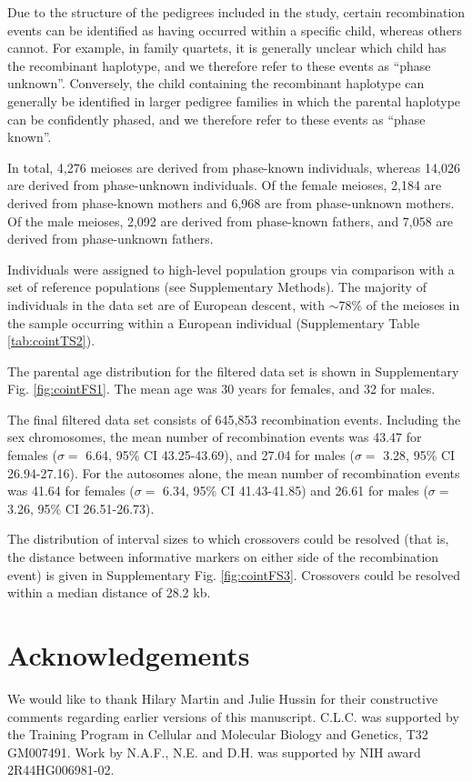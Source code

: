 Due to the structure of the pedigrees included in the study, certain
recombination events can be identified as having occurred within a specific child,
whereas others cannot. For example, in family quartets, it is generally unclear
which child has the recombinant haplotype, and we therefore refer to these events
as ``phase unknown''. Conversely, the child containing the recombinant haplotype
can generally be identified in larger pedigree families in which the parental
haplotype can be confidently phased, and we therefore refer to these events as
``phase known''.

In total, 4,276 meioses are derived from phase-known individuals, whereas
14,026 are derived from phase-unknown individuals. Of the female meioses, 2,184
are derived from phase-known mothers and 6,968 are from phase-unknown
mothers. Of the male meioses, 2,092 are derived from phase-known fathers, and
7,058 are derived from phase-unknown fathers.

Individuals were assigned to high-level population groups via comparison with
a set of reference populations (see Supplementary Methods). The majority of
individuals in the data set are of European descent, with $\sim$78\% of the meioses in
the sample occurring within a European individual (Supplementary Table \ref{tab:cointTS2}).

The parental age distribution for the filtered data set is shown in Supplementary
Fig. \ref{fig:cointFS1}. The mean age was 30 years for females, and 32 for males.

The final filtered data set consists of 645,853 recombination events. Including
the sex chromosomes, the mean number of recombination events was 43.47 for
females ($\sigma=$ 6.64, 95\% CI 43.25-43.69), and 27.04 for males ($\sigma=$ 3.28, 95\% CI
26.94-27.16). For the autosomes alone, the mean number of recombination events
was 41.64 for females ($\sigma=$ 6.34, 95\% CI 41.43-41.85) and 26.61 for males
($\sigma=$ 3.26, 95\% CI 26.51-26.73).

The distribution of interval sizes to which crossovers could be resolved (that is,
the distance between informative markers on either side of the recombination
event) is given in Supplementary Fig. \ref{fig:cointFS3}. Crossovers could be resolved within a
median distance of 28.2 kb.

\section{Acknowledgements}
We would like to thank Hilary Martin and Julie Hussin for their constructive comments
regarding earlier versions of this manuscript. C.L.C. was supported by the Training
Program in Cellular and Molecular Biology and Genetics, T32 GM007491. Work by
N.A.F., N.E. and D.H. was supported by NIH award 2R44HG006981-02.

